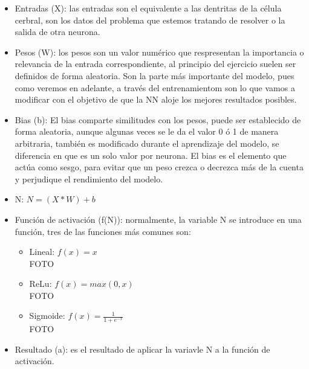 \documentclass[a4paper,10pt]{article}
\begin{document}
\begin{itemize}
    \item Entradas (X): las entradas son el equivalente a las dentritas de la célula cerbral, son los datos del problema que estemos tratando de resolver o la salida de otra neurona.
    \item Pesos (W): los pesos son un valor numérico que respresentan la importancia o relevancia de la entrada correspondiente, al principio del ejercicio suelen ser definidos de forma aleatoria. Son la parte más importante del modelo, pues como veremos en adelante, a través del entrenamientom son lo que vamos a modificar con el objetivo de que la NN aloje los mejores resultados posibles.
    \item Bias (b): El bias comparte similitudes con los pesos, puede ser establecido de forma aleatoria, aunque algunas veces se le da el valor 0 ó 1 de manera arbitraria,   también es modificado durante el aprendizaje del modelo, se diferencia en que es un solo valor por neurona. El bias es el elemento que actúa como sesgo, para evitar que un peso crezca o decrezca más de la cuenta y perjudique el rendimiento del modelo.
    \item N: $N=(X*W)+b$
    \item Función de activación (f(N)): normalmente, la variable N se introduce en una función, tres de las funciones más comunes son:
    \begin{itemize}
    \item Lineal: $f(x)=x$ \\FOTO
    \item ReLu: $f(x)=max(0,x)$ \\FOTO
    \item Sigmoide: $f(x)= \frac{1}{1+e^{-x}}$ \\FOTO
    \end{itemize}
    \item Resultado (a): es el resultado de aplicar la variavle N a la función de activación.
        
\end{itemize}
\end{document}
